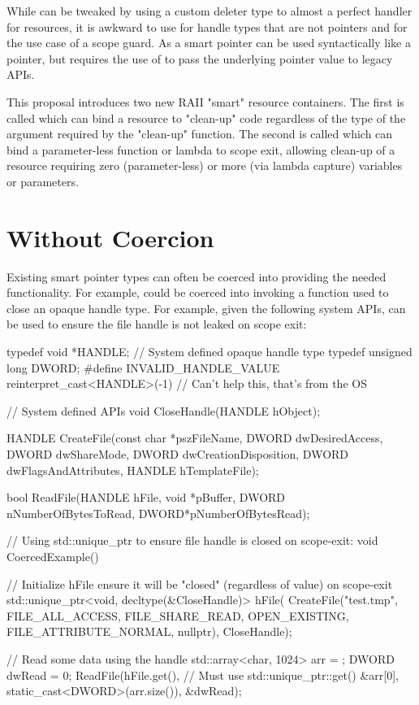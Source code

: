 \documentclass[ebook,11pt,article]{memoir}
\begin{document}
While  can be tweaked by using a custom deleter type to almost a perfect handler for resources, it is awkward to use for handle types that are not pointers and for the use case of a scope guard. As a smart pointer   can be used syntactically like a pointer, but requires the use of  to pass the underlying pointer value to legacy APIs.

This proposal introduces two new RAII "smart" resource containers.  The first is called  which can bind a resource to "clean-up" code regardless of the type of the argument required by the "clean-up" function.  The second is called  which can bind a parameter-less function or lambda to scope exit, allowing clean-up of a resource requiring zero (parameter-less) or more (via lambda capture) variables or parameters.

\section {Without Coercion}
Existing smart pointer types can often be coerced into providing the needed functionality.  For example,  could be coerced into invoking a function used to close an opaque handle type.  For example, given the following system APIs,  can be used to ensure the file handle is not leaked on scope exit:

\begin{codeblock}
typedef void *HANDLE;        // System defined opaque handle type
typedef unsigned long DWORD;
#define INVALID_HANDLE_VALUE reinterpret_cast<HANDLE>(-1)	
// Can't help this, that's from the OS

// System defined APIs
void CloseHandle(HANDLE hObject);

HANDLE CreateFile(const char *pszFileName, 
	DWORD dwDesiredAccess, 
	DWORD dwShareMode, 
	DWORD dwCreationDisposition, 
	DWORD dwFlagsAndAttributes, 
	HANDLE hTemplateFile);

bool ReadFile(HANDLE hFile, 
	void *pBuffer, 
	DWORD nNumberOfBytesToRead, 
	DWORD*pNumberOfBytesRead);

// Using std::unique_ptr to ensure file handle is closed on scope-exit:
void CoercedExample()
{
	// Initialize hFile ensure it will be "closed" (regardless of value) on scope-exit
	std::unique_ptr<void, decltype(&CloseHandle)> hFile(
		CreateFile("test.tmp", 
			FILE_ALL_ACCESS, 
			FILE_SHARE_READ, 
			OPEN_EXISTING, 
			FILE_ATTRIBUTE_NORMAL,
			nullptr), 
		CloseHandle);

	// Read some data using the handle
	std::array<char, 1024> arr = { };
	DWORD dwRead = 0;
	ReadFile(hFile.get(),	// Must use std::unique_ptr::get()
		&arr[0], 
		static_cast<DWORD>(arr.size()), 
		&dwRead);
}
\end{codeblock}
\end{document}

